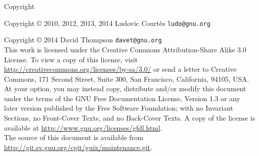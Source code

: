 \documentclass{beamer}
\begin{document}
\begin{frame}{Copyright}
  \tiny{
    Copyright \copyright{} 2010, 2012, 2013, 2014 Ludovic Courtès \texttt{ludo@gnu.org}

    Copyright \copyright{} 2014 David Thompson \texttt{davet@gnu.org}\\[2.0mm]
    This work is licensed under the \alert{Creative Commons
    Attribution-Share Alike 3.0} License.  To view a copy of this
    license, visit
    \url{http://creativecommons.org/licenses/by-sa/3.0/} or send a
    letter to Creative Commons, 171 Second Street, Suite 300, San
    Francisco, California, 94105, USA.
    \\[2.0mm]
    At your option, you may instead copy, distribute and/or modify
    this document under the terms of the \alert{GNU Free Documentation
      License, Version 1.3 or any later version} published by the Free
    Software Foundation; with no Invariant Sections, no Front-Cover
    Texts, and no Back-Cover Texts.  A copy of the license is
    available at \url{http://www.gnu.org/licenses/gfdl.html}.
    \\[2.0mm]
    The source of this document is available from
    \url{http://git.sv.gnu.org/cgit/guix/maintenance.git}.
  }
\end{frame}
\end{document}
